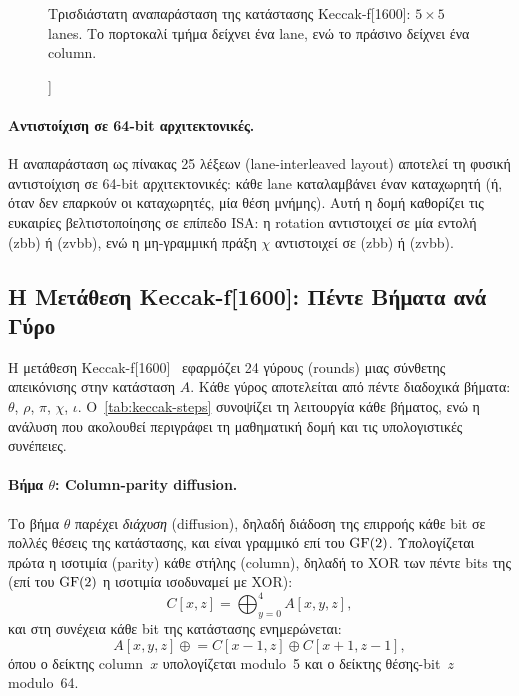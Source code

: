 \begin{figure}[htbp]
  \centering
  
  \caption[Κατάσταση Keccak-f[1600]]{Τρισδιάστατη αναπαράσταση της κατάστασης Keccak-f[1600]:
  $5 \times 5$ lanes.
  Το πορτοκαλί τμήμα δείχνει ένα lane, ενώ το πράσινο δείχνει ένα column.}
  \label{fig:keccak-state-3d}
\end{figure}

\paragraph{Αντιστοίχιση σε 64-bit αρχιτεκτονικές.}
Η αναπαράσταση ως πίνακας 25 λέξεων  (lane-interleaved layout)
αποτελεί τη φυσική αντιστοίχιση σε 64-bit αρχιτεκτονικές: κάθε lane
καταλαμβάνει έναν καταχωρητή (ή, όταν δεν επαρκούν οι καταχωρητές, μία θέση μνήμης).
Αυτή η δομή καθορίζει τις ευκαιρίες βελτιστοποίησης σε επίπεδο ISA: η
rotation αντιστοιχεί σε μία εντολή \rori{} (\gls{zbb}) ή \vror{} (\gls{zvbb}), ενώ
η μη-γραμμική πράξη $\chi$ αντιστοιχεί σε  (\gls{zbb}) ή
 (\gls{zvbb}).


\subsection{Η Μετάθεση Keccak-f[1600]: Πέντε Βήματα ανά Γύρο}
\label{sec:keccak-permutation}

Η μετάθεση Keccak-f[1600]~\cite{Bertoni2013-Keccak} εφαρμόζει 24 γύρους (rounds) μιας σύνθετης
απεικόνισης στην κατάσταση $A$.
Κάθε γύρος αποτελείται από πέντε διαδοχικά βήματα: $\theta$, $\rho$, $\pi$,
$\chi$, $\iota$.
Ο~\cref{tab:keccak-steps} συνοψίζει τη λειτουργία κάθε βήματος, ενώ η
ανάλυση που ακολουθεί περιγράφει τη μαθηματική δομή και τις υπολογιστικές
συνέπειες.

\begin{table}[htbp]
  \centering
  \caption{Τα πέντε βήματα ενός γύρου Keccak-f[1600].}
  \label{tab:keccak-steps}
  
\end{table}

\paragraph{Βήμα $\theta$: Column-parity diffusion.}
Το βήμα $\theta$ παρέχει \emph{διάχυση} (diffusion), δηλαδή διάδοση της επιρροής κάθε bit σε πολλές θέσεις της κατάστασης, και είναι γραμμικό επί του $\mathrm{GF}(2)$.
Υπολογίζεται πρώτα η ισοτιμία (parity) κάθε στήλης (column), δηλαδή το XOR των πέντε bits της (επί του $\mathrm{GF}(2)$ η ισοτιμία ισοδυναμεί με XOR):
\begin{equation}
  C[x, z] = \bigoplus_{y=0}^{4} A[x, y, z],
\end{equation}
και στη συνέχεια κάθε bit της κατάστασης ενημερώνεται:
\begin{equation}
  A[x, y, z] \mathrel{\oplus}= C[x-1, z] \oplus C[x+1, z-1],
  \label{eq:keccak-theta-diffusion}
\end{equation}
όπου ο δείκτης column~$x$ υπολογίζεται modulo~5 και ο δείκτης
θέσης-bit~$z$ modulo~64.

